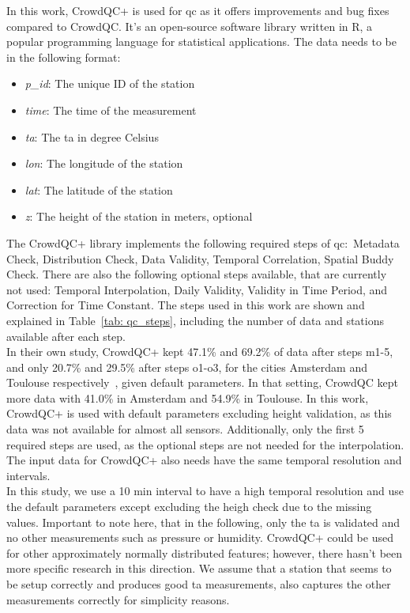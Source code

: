 In this work, CrowdQC+ is used for \gls{qc} as it offers improvements and bug fixes compared to CrowdQC. It's an open-source software library written in R, a popular programming language for statistical applications. The data needs to be in the following format:

\begin{itemize}
    \item \textit{p\_id}: The unique ID of the station
    \item \textit{time}: The time of the measurement
    \item \textit{ta}: The \gls{ta} in degree Celsius
    \item \textit{lon}: The longitude of the station
    \item \textit{lat}: The latitude of the station
    \item \textit{z}: The height of the station in meters, optional
\end{itemize}

The CrowdQC+ library implements the following required steps of \gls{qc}:\ Metadata Check, Distribution Check, Data Validity, Temporal Correlation, Spatial Buddy Check. There are also the following optional steps available, that are currently not used: Temporal Interpolation, Daily Validity, Validity in Time Period, and Correction for Time Constant.
The steps used in this work are shown and explained in Table~\ref{tab: qc_steps}, including the number of data and stations available after each step.\\
In their own study, CrowdQC+ kept 47.1\% and 69.2\% of data after steps m1-5, and only 20.7\% and 29.5\% after steps o1-o3, for the cities Amsterdam and Toulouse respectively~\cite{fenner2021crowdqc+}, given default parameters. In that setting, CrowdQC kept more data with 41.0\% in Amsterdam and 54.9\% in Toulouse. In this work, CrowdQC+ is used with default parameters excluding height validation, as this data was not available for almost all sensors. Additionally, only the first 5 required steps are used, as the optional steps are not needed for the interpolation. The input data for CrowdQC+ also needs have the same temporal resolution and intervals.\\
In this study, we use a 10 min interval to have a high temporal resolution and use the default parameters except excluding the heigh check due to the missing values. Important to note here, that in the following, only the \gls{ta} is validated and no other measurements such as pressure or humidity. CrowdQC+ could be used for other approximately normally distributed features; however, there hasn't been more specific research in this direction. We assume that a station that seems to be setup correctly and produces good \gls{ta} measurements, also captures the other measurements correctly for simplicity reasons.

